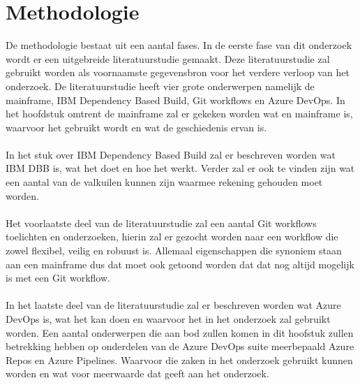 
\section{Methodologie}%
\label{sec:methodologie}

De methodologie bestaat uit een aantal fases.
In de eerste fase van dit onderzoek wordt er een uitgebreide literatuurstudie gemaakt. 
Deze literatuurstudie zal gebruikt worden als voornaamste gegevensbron voor het verdere verloop van het onderzoek.
De literatuurstudie heeft vier grote onderwerpen namelijk de mainframe, IBM Dependency Based Build, Git workflows en Azure DevOps.
In het hoofdstuk omtrent de mainframe zal er gekeken worden wat en mainframe is, waarvoor het gebruikt wordt en wat de geschiedenis ervan is. 
\\ \\
In het stuk over IBM Dependency Based Build zal er beschreven worden wat IBM DBB is, wat het doet en hoe het werkt. 
Verder zal er ook te vinden zijn wat een aantal van de valkuilen kunnen zijn waarmee rekening gehouden moet worden.
\\ \\
Het voorlaatste deel van de literatuurstudie zal een aantal Git workflows toelichten en onderzoeken, hierin zal er gezocht worden naar een workflow die zowel flexibel, veilig en robuust is. 
Allemaal eigenschappen die synoniem staan aan een mainframe dus dat moet ook getoond worden dat dat nog altijd mogelijk is met een Git workflow. 
\\ \\ 
In het laatste deel van de literatuurstudie zal er beschreven worden wat Azure DevOps is, wat het kan doen en waarvoor het in het onderzoek zal gebruikt worden. 
Een aantal onderwerpen die aan bod zullen komen in dit hoofstuk zullen betrekking hebben op onderdelen van de Azure DevOps suite meerbepaald Azure Repos en Azure Pipelines. 
Waarvoor die zaken in het onderzoek gebruikt kunnen worden en wat voor meerwaarde dat geeft aan het onderzoek. 
\\ \\ 
